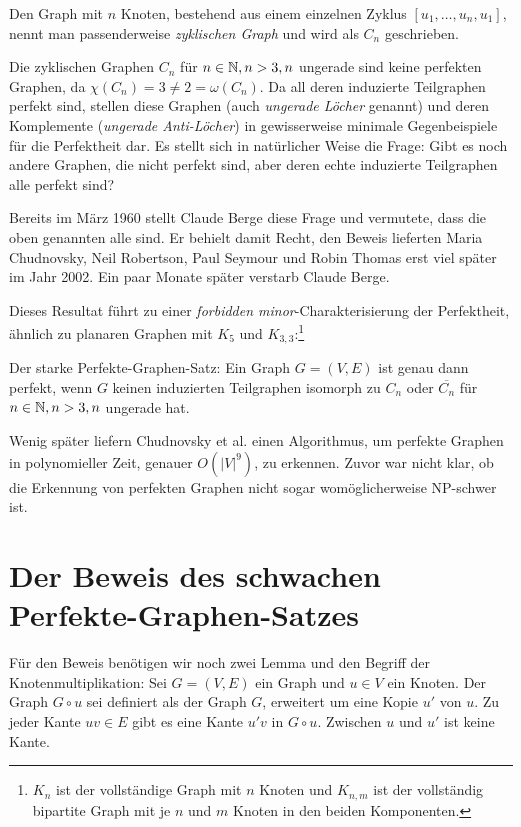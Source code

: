 \documentclass[../main.tex]{subfiles}
\begin{document}
Den Graph mit $n$ Knoten, bestehend aus einem einzelnen Zyklus $[u_1, \hdots, u_n, u_1]$, nennt man passenderweise \emph{zyklischen Graph} und wird als $C_n$ geschrieben.

Die zyklischen Graphen $C_n$ für $n \in \mathbb{N}, n > 3, n$ ungerade sind keine perfekten Graphen, da $\chi(C_n) = 3 \neq 2 = \omega(C_n)$. Da all deren induzierte Teilgraphen perfekt sind, stellen diese Graphen (auch \emph{ungerade Löcher} genannt) und deren Komplemente (\emph{ungerade Anti-Löcher}) in gewisserweise minimale Gegenbeispiele für die Perfektheit dar. Es stellt sich in natürlicher Weise die Frage: Gibt es noch andere Graphen, die nicht perfekt sind, aber deren echte induzierte Teilgraphen alle perfekt sind?

Bereits im März 1960 stellt Claude Berge diese Frage und vermutete, dass die oben genannten alle sind.\cite{das_Buch} Er behielt damit Recht, den Beweis lieferten Maria Chudnovsky, Neil Robertson, Paul Seymour und Robin Thomas\cite{chudnovsky2002strongperfectgraphtheorem} erst viel später im Jahr 2002. Ein paar Monate später verstarb Claude Berge.

Dieses Resultat führt zu einer \emph{forbidden minor}-Charakterisierung der Perfektheit, ähnlich zu planaren Graphen mit $K_5$ und $K_{3,3}$:\footnote{$K_n$ ist der vollständige Graph mit $n$ Knoten und $K_{n,m}$ ist der vollständig bipartite Graph mit je $n$ und $m$ Knoten in den beiden Komponenten.}

\begin{satz}
    \label{thm:spgt}
    Der starke Perfekte-Graphen-Satz: Ein Graph $G = (V, E)$ ist genau dann perfekt, wenn $G$ keinen induzierten Teilgraphen isomorph zu $C_n$ oder $\overline{C_n}$ für $n \in \mathbb{N}, n > 3, n$ ungerade hat.
\end{satz}

Wenig später liefern Chudnovsky et al. einen Algorithmus, um perfekte Graphen in polynomieller Zeit, genauer $O(|V|^9)$, zu erkennen. Zuvor war nicht klar, ob die Erkennung von perfekten Graphen nicht sogar womöglicherweise NP-schwer ist.\cite{recognizing_berge}

\section{Der Beweis des schwachen Perfekte-Graphen-Satzes}

Für den Beweis benötigen wir noch zwei Lemma und den Begriff der Knotenmultiplikation: Sei $G = (V, E)$ ein Graph und $u \in V$ ein Knoten. Der Graph $G \circ u$ sei definiert als der Graph $G$, erweitert um eine Kopie $u'$ von $u$. Zu jeder Kante $uv \in E$ gibt es eine Kante $u'v$ in $G \circ u$. Zwischen $u$ und $u'$ ist keine Kante.
\end{document}
